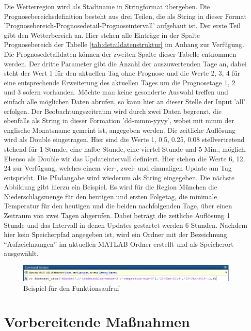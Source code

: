 Die Wetterregion wird als Stadtname in Stringformat übergeben. Die Prognosebereichsdefinition besteht aus drei Teilen, die als String in dieser Format 'Prognosebereich-Prognosedetail-Prognoseintervall' aufgebaut ist. Der erste Teil gibt den Wetterbereich an. Hier stehen alle Einträge in der Spalte Prognosebereich der Tabelle \ref{tab:detaildatenstruktur} im Anhang zur Verfügung. Die Prognosedetaildaten können der zweiten Spalte dieser Tabelle entnommen werden. Der dritte Parameter gibt die Anzahl der auszuwertenden Tage an, dabei steht der Wert 1 für den aktuellen Tag ohne Prognose und die Werte 2, 3, 4 für eine entsprechende Erweiterung des aktuellen Tages um die Prognosetage 1, 2 und 3 sofern vorhanden. Möchte man keine gesonderte Auswahl treffen und einfach alle möglichen Daten abrufen, so kann hier an dieser Stelle der Input 'all' erfolgen. Der Beobachtungszeitraum wird durch zwei Daten begrenzt, die ebenfalls als String in dieser Formation 'dd-mmm-yyyy', wobei mit mmm der englische Monatsname gemeint ist, angegeben werden. Die zeitliche Auflösung wird als Double eingetragen. Hier sind die Werte 1, 0.5, 0.25, 0.08 stellvertretend stehend für 1 Stunde, eine halbe Stunde, eine viertel Stunde und 5 Min., möglich. Ebenso als Double wir das Updateintervall definiert. Hier stehen die Werte 6, 12, 24 zur Verfügung, welches einem vier-, zwei- und einmaligen Update am Tag entspricht. Die Pfadangabe wird wiederum als String eingegeben. Die nächste Abbildung gibt hierzu ein Beispiel. Es wird für die Region München die Niederschlagsmenge für den heutigen und ersten Folgetag, die minimale Temperatur für den heutigen und die beiden nachfolgenden Tage, über einen Zeitraum von zwei Tagen abgerufen. Dabei beträgt die zeitliche Auflösung 1 Stunde und das Intervall in denen Updates gestartet werden 6 Stunden. Nachdem hier kein Speicherpfad angegeben ist, wird ein Ordner mit der Bezeichnung \enquote{Aufzeichnungen} im aktuellen MATLAB Ordner erstellt und als Speicherort ausgewählt. 
\begin{figure}
\centering
\includegraphics[scale=0.7]{programm/funkaufruf}
\caption{Beispiel für den Funktionsaufruf}
\label{fig:funkaufruf}
\end{figure} 
\section{Vorbereitende Maßnahmen}

